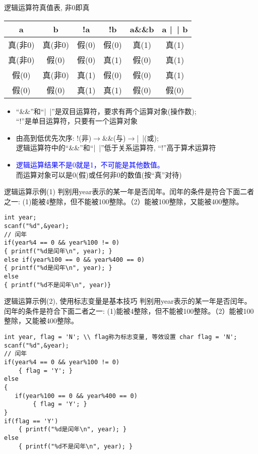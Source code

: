 \begin{frame}{逻辑运算符真值表, 非0即真}
\centering
\begin{tabular}{|c|c||c|c|c|c|}
\hline 
a       & b      & !a    & !b    & a\&\&b & a |~| b \\ 
\hline 
真(非0) & 真(非0) & 假(0) & 假(0) & 真(1)  & 真(1) \\ 
\hline
真(非0) & 假(0)   & 假(0) & 真(1) & 假(0)  & 真(1) \\ 
\hline 
假(0)   & 真(非0) & 真(1) & 假(0) & 假(0)  & 真(1) \\ 
\hline 
假(0)   & 假(0)   & 真(1) & 真(1) & 假(0)  & 假(0) \\ 
\hline  
\end{tabular} 
\begin{itemize}
	\item ``\&\&''和``|~|''是双目运算符，要求有两个运算对象(操作数);\\ ``!''是单目运算符，只要有一个运算对象
	\item 由高到低优先次序: !(非)$\to$\&\&(与)$\to$|~|(或);\\
          逻辑运算符中的``\&\&''和``|~|''低于关系运算符, ``!''高于算术运算符
	\item \textcolor{blue}{逻辑运算结果不是0就是1，不可能是其他数值。}\\
	      而运算对象可以是0(假)或任何非0的数值(按``真''对待)
\end{itemize}
\end{frame}

\begin{frame}{逻辑运算示例(1)}
判别用year表示的某一年是否闰年。闰年的条件是符合下面二者之一: (1)能被4整除，但不能被100整除。（2）能被100整除，又能被400整除。
\begin{lstlisting}
int year;
scanf("%d",&year);
// 闰年
if(year%4 == 0 && year%100 != 0)
{ printf("%d是闰年\n", year); }
else if(year%100 == 0 && year%400 == 0)
{ printf("%d是闰年\n", year); }
else
{ printf("%d不是闰年\n", year)}
\end{lstlisting}
\end{frame}

\begin{frame}{逻辑运算示例(2), 使用标志变量是基本技巧}
判别用year表示的某一年是否闰年。闰年的条件是符合下面二者之一: (1)能被4整除，但不能被100整除。（2）能被100整除，又能被400整除。
\begin{lstlisting}
int year, flag = 'N'; \\ flag称为标志变量, 等效设置 char flag = 'N'; 
scanf("%d",&year);
// 闰年
if(year%4 == 0 && year%100 != 0)
	{ flag = 'Y'; }
else
{ 
   if(year%100 == 0 && year%400 == 0)
   		{ flag = 'Y'; }
}
if(flag == 'Y') 
	{ printf("%d是闰年\n", year); }
else
	{ printf("%d不是闰年\n", year); }
\end{lstlisting}
\end{frame}

